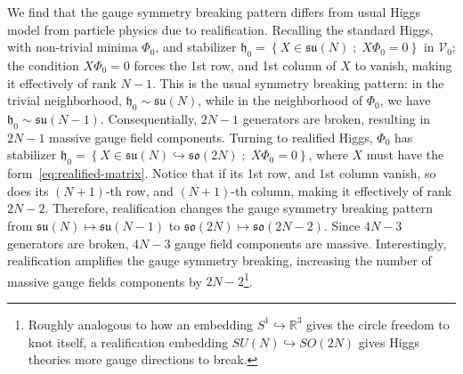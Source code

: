 \documentclass[../main.tex]{subfiles}
\begin{document}
We find that the gauge symmetry breaking pattern differs from usual Higgs model from particle physics due to realification. Recalling the standard Higgs, with non-trivial minima $\Phi_0$, and stabilizer $\mathfrak{h}_0 = \left\{ X \in \mathfrak{su}(N) \; ; \; X \Phi_0 = 0\right\} $ in $ \mathcal{V}_0 $; the condition $X \Phi_0 = 0$ forces the 1st row, and 1st column of $X$ to vanish, making it effectively of rank $N-1$. This is the usual symmetry breaking pattern: in the trivial neighborhood, $\mathfrak{h}_0 \sim \mathfrak{su}(N)$, while in the neighborhood of $\Phi_0$, we have $\mathfrak{h}_0 \sim \mathfrak{su}(N-1)$. Consequentially, $2N-1$ generators are broken, resulting in $2N-1$ massive gauge field components. Turning to realified Higgs, $\Phi_0$ has stabilizer $\mathfrak{h}_0 = \left\{ X \in \mathfrak{su}(N) \hookrightarrow \mathfrak{so}(2N) \; ; \; X \Phi_0 = 0 \right\}$, where $X$ must have the form~\eqref{eq:realified-matrix}. Notice that if its 1st row, and 1st column vanish, so does its $(N+1)$-th row, and $(N+1)$-th column, making it effectively of rank $2N-2$. Therefore, realification changes the gauge symmetry breaking pattern from $\mathfrak{su}(N) \mapsto \mathfrak{su}(N-1)$ to $\mathfrak{so}(2N) \mapsto \mathfrak{so}(2N-2)$. Since $4N-3$ generators are broken, $4N-3$ gauge field components are massive. Interestingly, realification amplifies the gauge symmetry breaking, increasing the number of massive gauge fields components by $2N-2$\footnote{Roughly analogous to how an embedding $S^{1} \hookrightarrow \mathbb{R}^3$ gives the circle freedom to knot itself, a realification embedding $SU(N) \hookrightarrow SO(2N)$ gives Higgs theories more gauge directions to break.}.
\end{document}

